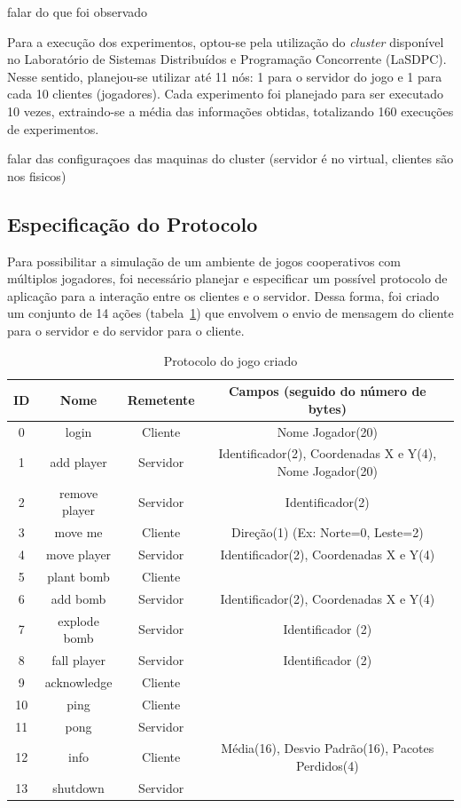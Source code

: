 \documentclass[12pt]{article}
\begin{document}
falar do que foi observado

Para a execução dos experimentos, optou-se pela utilização do \textit{cluster}
disponível no Laboratório de Sistemas Distribuídos e Programação Concorrente
(LaSDPC). Nesse sentido, planejou-se utilizar até 11 nós: 1 para o servidor do
jogo e 1 para cada 10 clientes (jogadores). Cada experimento foi planejado para
ser executado 10 vezes, extraindo-se a média das informações obtidas,
totalizando 160 execuções de experimentos.

falar das configuraçoes das maquinas do cluster (servidor é no virtual, clientes são nos fisicos)

\subsection{Especificação do Protocolo} \label{sub:protocolo}

Para possibilitar a simulação de um ambiente de jogos cooperativos com
múltiplos jogadores, foi necessário planejar e especificar um possível
protocolo de aplicação para a interação entre os clientes e o servidor.  Dessa
forma, foi criado um conjunto de 14 ações (tabela~\ref{tab:protocolo}) que
envolvem o envio de mensagem do cliente para o servidor e do servidor para o
cliente.

\begin{table}
  \center
  \footnotesize
  \begin{tabular}{|c|c|c|c|}
  \hline
    \textbf{ID} & \textbf{Nome} & \textbf{Remetente} & \textbf{Campos (seguido do número de bytes)} \\ \hline
    0 & login & Cliente & Nome Jogador(20)  \\ \hline
    1 & add player & Servidor & Identificador(2), Coordenadas X e Y(4), Nome Jogador(20)\\ \hline
    2 & remove player & Servidor & Identificador(2) \\ \hline
    3 & move me & Cliente & Direção(1) (Ex: Norte=0, Leste=2) \\ \hline
    4 & move player & Servidor & Identificador(2), Coordenadas X e Y(4) \\ \hline
    5 & plant bomb & Cliente & \\ \hline
    6 & add bomb & Servidor &  Identificador(2), Coordenadas X e Y(4)  \\ \hline
    7 & explode bomb & Servidor & Identificador (2) \\ \hline
    8 & fall player & Servidor & Identificador (2) \\ \hline
    9 & acknowledge & Cliente & \\ \hline
   10 & ping & Cliente & \\ \hline
   11 & pong & Servidor & \\ \hline
   12 & info & Cliente & Média(16), Desvio Padrão(16), Pacotes Perdidos(4)  \\ \hline
   13 & shutdown & Servidor &\\ \hline
  \end{tabular} 
\caption{Protocolo do jogo criado}
\label{tab:protocolo}
\end{table} 
\end{document}
